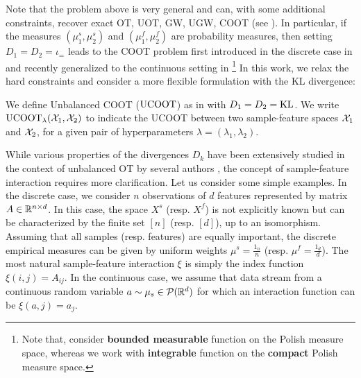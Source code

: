 Note that the problem above is very general and can, with some additional
constraints, recover exact OT, UOT, GW, UGW, COOT (see ).
In particular, if the measures $(\mu^s_1, \mu^s_2)$ and $(\mu^f_1, \mu^f_2)$
are probability measures, then setting $D_1 = D_2 = \iota_=$ leads to the
COOT problem first introduced in the discrete case in \citep{Redko20} and
recently generalized to the continuous setting in \citep{Chowdhury21b}
\footnote{Note that, \citep{Chowdhury21b} consider \textbf{bounded measurable} function
on the Polish measure space, whereas we work with \textbf{integrable} function
on the \textbf{compact} Polish measure space.}
In this work, we relax the hard constraints and consider a more flexible formulation
with the KL divergence:
\begin{definition}[UCOOT]
   We define Unbalanced COOT ($\text{UCOOT}$) as in  with $D_1 = D_2 = \text{KL}$.
   We write $\text{UCOOT}_{\lambda}(\mathcal X_1, \mathcal X_2)$ to indicate the UCOOT between
   two sample-feature spaces $\mathcal X_1$ and $\mathcal X_2$, for a given
   pair of hyperparameters $\lambda = (\lambda_1, \lambda_2)$.
\end{definition}
While various properties of the divergences $D_k$ have been extensively studied
in the context of unbalanced OT by several authors \citep{Chizat17,Frogner15},
the concept of sample-feature interaction requires more clarification.
Let us consider some simple examples.
In the discrete case, we consider $n$ observations of $d$ features
represented by matrix $A \in \mathbb R^{n \times d}$. In this case, the space $X^s$ (resp. $X^f$)
is not explicitly known but can be characterized by the finite set $[n]$ (resp. $[d]$),
up to an isomorphism. Assuming that all samples (resp. features) are equally important,
the discrete empirical measures can be given by uniform weights $\mu^s = \frac{1_{n}}{n}$
(resp. $\mu^f = \frac{1_{d}}{d}$). The most natural sample-feature interaction $\xi$ is simply
the index function $\xi(i, j) = A_{ij}$. In the continuous case,
we assume that data stream from a continuous random variable $a \sim \mu_s \in \mathcal P(\mathbb R^d)$
for which an interaction function can be $\xi(a, j) = a_j$.
